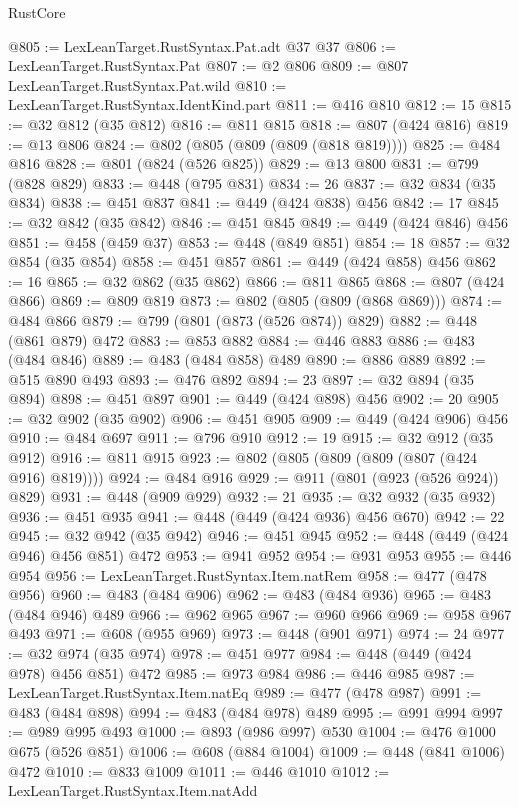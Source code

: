 \begin{lexlean}{RustCore}
\begin{coremodule}
@805 := LexLeanTarget.RustSyntax.Pat.adt @37 @37
@806 := LexLeanTarget.RustSyntax.Pat
@807 := @2 @806
@809 := @807 LexLeanTarget.RustSyntax.Pat.wild
@810 := LexLeanTarget.RustSyntax.IdentKind.part
@811 := @416 @810
@812 := 15
@815 := @32 @812 (@35 @812)
@816 := @811 @815
@818 := @807 (@424 @816)
@819 := @13 @806
@824 := @802 (@805 (@809 (@809 (@818 @819))))
@825 := @484 @816
@828 := @801 (@824 (@526 @825))
@829 := @13 @800
@831 := @799 (@828 @829)
@833 := @448 (@795 @831)
@834 := 26
@837 := @32 @834 (@35 @834)
@838 := @451 @837
@841 := @449 (@424 @838) @456
@842 := 17
@845 := @32 @842 (@35 @842)
@846 := @451 @845
@849 := @449 (@424 @846) @456
@851 := @458 (@459 @37)
@853 := @448 (@849 @851)
@854 := 18
@857 := @32 @854 (@35 @854)
@858 := @451 @857
@861 := @449 (@424 @858) @456
@862 := 16
@865 := @32 @862 (@35 @862)
@866 := @811 @865
@868 := @807 (@424 @866)
@869 := @809 @819
@873 := @802 (@805 (@809 (@868 @869)))
@874 := @484 @866
@879 := @799 (@801 (@873 (@526 @874)) @829)
@882 := @448 (@861 @879) @472
@883 := @853 @882
@884 := @446 @883
@886 := @483 (@484 @846)
@889 := @483 (@484 @858) @489
@890 := @886 @889
@892 := @515 @890 @493
@893 := @476 @892
@894 := 23
@897 := @32 @894 (@35 @894)
@898 := @451 @897
@901 := @449 (@424 @898) @456
@902 := 20
@905 := @32 @902 (@35 @902)
@906 := @451 @905
@909 := @449 (@424 @906) @456
@910 := @484 @697
@911 := @796 @910
@912 := 19
@915 := @32 @912 (@35 @912)
@916 := @811 @915
@923 := @802 (@805 (@809 (@809 (@807 (@424 @916) @819))))
@924 := @484 @916
@929 := @911 (@801 (@923 (@526 @924)) @829)
@931 := @448 (@909 @929)
@932 := 21
@935 := @32 @932 (@35 @932)
@936 := @451 @935
@941 := @448 (@449 (@424 @936) @456 @670)
@942 := 22
@945 := @32 @942 (@35 @942)
@946 := @451 @945
@952 := @448 (@449 (@424 @946) @456 @851) @472
@953 := @941 @952
@954 := @931 @953
@955 := @446 @954
@956 := LexLeanTarget.RustSyntax.Item.natRem
@958 := @477 (@478 @956)
@960 := @483 (@484 @906)
@962 := @483 (@484 @936)
@965 := @483 (@484 @946) @489
@966 := @962 @965
@967 := @960 @966
@969 := @958 @967 @493
@971 := @608 (@955 @969)
@973 := @448 (@901 @971)
@974 := 24
@977 := @32 @974 (@35 @974)
@978 := @451 @977
@984 := @448 (@449 (@424 @978) @456 @851) @472
@985 := @973 @984
@986 := @446 @985
@987 := LexLeanTarget.RustSyntax.Item.natEq
@989 := @477 (@478 @987)
@991 := @483 (@484 @898)
@994 := @483 (@484 @978) @489
@995 := @991 @994
@997 := @989 @995 @493
@1000 := @893 (@986 @997) @530
@1004 := @476 @1000 @675 (@526 @851)
@1006 := @608 (@884 @1004)
@1009 := @448 (@841 @1006) @472
@1010 := @833 @1009
@1011 := @446 @1010
@1012 := LexLeanTarget.RustSyntax.Item.natAdd

\end{coremodule}
\end{lexlean}
